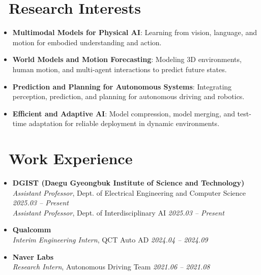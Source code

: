 \documentclass[a4paper,11pt]{article}
\begin{document}
\section{\faFlask\ Research Interests}
\begin{itemize}[leftmargin=0.3cm]
    \item \textbf{Multimodal Models for Physical AI}: Learning from vision, language, and motion for embodied understanding and action.
    \item \textbf{World Models and Motion Forecasting}: Modeling 3D environments, human motion, and multi-agent interactions to predict future states.
    \item \textbf{Prediction and Planning for Autonomous Systems}: Integrating perception, prediction, and planning for autonomous driving and robotics.
    \item \textbf{Efficient and Adaptive AI}: Model compression, model merging, and test-time adaptation for reliable deployment in dynamic environments.
\end{itemize}

\section{\faBriefcase\ Work Experience}
\begin{itemize}[leftmargin=0.25cm]

\item \textbf{DGIST (Daegu Gyeongbuk Institute of Science and Technology)}  \\
\textit{Assistant Professor}, Dept. of Electrical Engineering and Computer Science \hfill \textit{2025.03 -- Present} \\
\textit{Assistant Professor}, Dept. of Interdisciplinary AI \hfill \textit{2025.03 -- Present} \\

\item \textbf{Qualcomm} \\
\textit{Interim Engineering Intern}, QCT Auto AD \hfill \textit{2024.04 -- 2024.09} 

\item \textbf{Naver Labs} \\
\textit{Research Intern}, Autonomous Driving Team \hfill \textit{2021.06 -- 2021.08} 

\end{itemize}
\end{document}
